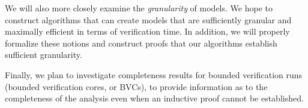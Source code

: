 We will also more closely examine the {\em granularity} of models.  We hope to construct algorithms that can create models that are sufficiently granular and maximally efficient in terms of verification time.  In addition, we will properly formalize these notions and construct proofs that our algorithms establish sufficient granularity.

Finally, we plan to investigate completeness results for bounded verification runs (bounded verification cores, or BVCs), to provide information as to the completeness of the analysis even when an inductive proof cannot be established.
\clearpage
